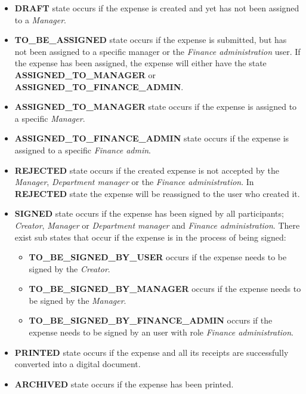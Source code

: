\begin{itemize}
    \item \textbf{DRAFT} state occurs if the expense is created and yet has not been assigned to a \textit{Manager}.

    \item \textbf{TO\_BE\_ASSIGNED} state occurs if the expense is submitted, but has not been assigned to a specific manager or the \textit{Finance administration} user. If the expense has been assigned, the expense will either have the state \newline \textbf{ASSIGNED\_TO\_MANAGER} or \newline \textbf{ASSIGNED\_TO\_FINANCE\_ADMIN}.

    \item \textbf{ASSIGNED\_TO\_MANAGER} state occurs if the expense is assigned to a specific \textit{Manager}.

    \item \textbf{ASSIGNED\_TO\_FINANCE\_ADMIN} state occurs if the expense is assigned to a specific \textit{Finance admin}.

    \item \textbf{REJECTED} state occurs if the created expense is not accepted by the \textit{Manager}, \textit{Department manager} or the \textit{Finance administration}. In \textbf{REJECTED} state the expense will be reassigned to the user who created it.

    \item \textbf{SIGNED} state occurs if the expense has been signed by all participants; \textit{Creator}, \textit{Manager} or \textit{Department manager} and \textit{Finance administration}. There exist sub states that occur if the expense is in the process of being signed:
        \begin{itemize}
            \item \textbf{TO\_BE\_SIGNED\_BY\_USER} occurs if the expense needs to be signed by the \textit{Creator}.
            \item \textbf{TO\_BE\_SIGNED\_BY\_MANAGER} occurs if the expense needs to be \newline signed by the \textit{Manager}.
            \item \textbf{TO\_BE\_SIGNED\_BY\_FINANCE\_ADMIN} occurs if the expense \newline needs to be signed by an user with role \textit{Finance administration}.
        \end{itemize}

    \item \textbf{PRINTED} state occurs if the expense and all its receipts are successfully converted into a digital document.

    \item \textbf{ARCHIVED} state occurs if the expense has been printed.
\end{itemize}

